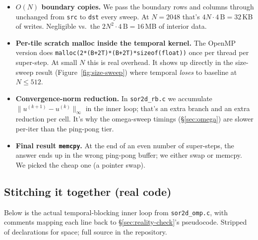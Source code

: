 \documentclass[11pt]{article}
\begin{document}
\begin{itemize}[leftmargin=1.4em,itemsep=2pt,topsep=2pt]
  \item \textbf{$O(N)$ boundary copies.}  We pass the boundary rows
        and columns through unchanged from \texttt{src} to
        \texttt{dst} every sweep.  At $N{=}2048$ that's
        $4N \cdot 4\,\text{B} = 32$\,KB of writes. Negligible vs.\
        the $2N^2{\cdot}4\,\text{B} = 16$\,MB of interior data.
  \item \textbf{Per-tile scratch malloc inside the temporal kernel.}
        The OpenMP version does
        \texttt{malloc(2*(B+2T)*(B+2T)*sizeof(float))} once per thread
        per super-step.  At
        small $N$ this is real overhead. It shows up directly in
        the size-sweep result (Figure~\ref{fig:size-sweep}) where
        temporal \emph{loses} to baseline at $N{\leq}512$.
  \item \textbf{Convergence-norm reduction.}  In \texttt{sor2d\_rb.c}
        we accumulate $\|u^{(k+1)} - u^{(k)}\|_\infty$ in the inner
        loop; that's an extra branch and an extra reduction per cell.
        It's why the omega-sweep timings (§\ref{sec:omega}) are
        slower per-iter than the ping-pong tier.
  \item \textbf{Final result \texttt{memcpy}.}  At the end of an
        even number of super-steps, the answer ends up in the wrong
        ping-pong buffer; we either swap or memcpy.  We picked the
        cheap one (a pointer swap).
\end{itemize}

\subsection{Stitching it together (real code)}

Below is the actual temporal-blocking inner loop from
\texttt{sor2d\_omp.c}, with comments mapping each line back to
§\ref{sec:reality-check}'s pseudocode.  Stripped of declarations
for space; full source in the repository.
\end{document}
